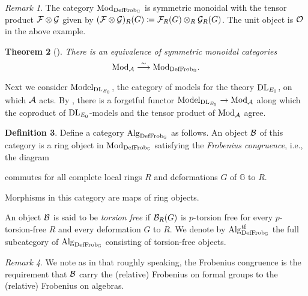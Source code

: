 \documentclass{gtpart}
\newtheorem{thm}{Theorem}
\theoremstyle{definition}
\newtheorem{defn}[thm]{Definition}
\theoremstyle{remark}
\newtheorem{rmk}[thm]{Remark}
\newcommand{\mb}[1]{\mathbb{#1}}
\newcommand{\CA}{{\cal A}}
\newcommand{\CB}{{\cal B}}
\newcommand{\CF}{{\cal F}}
\newcommand{\CG}{{\cal G}}
\newcommand{\CO}{{\cal O}}
\newcommand{\Mod}{{\rm Mod}}
\newcommand{\Alg}{{\rm Alg}}
\newcommand{\dl}{{\rm DL}}
\newcommand{\Frob}{{\rm Frob}}
\newcommand{\DF}{{{\rm DefFrob}_\BG}}
\newcommand{\Model}{{\rm Model}}
\newcommand{\BG}{{\mb G}}
\newcommand{\tf}{{\rm tf}}
\newcommand{\ce}{\coloneqq}
\numberwithin{equation}{section}
\numberwithin{thm}{section}
\begin{document}
\begin{rmk}
 The category $\Mod_\DF$ is symmetric monoidal with the tensor product 
 $\CF \otimes \CG$ given by 
 $(\CF \otimes \CG)_R(G) \ce \CF_R(G) \otimes_R \CG_R(G)$.  The unit 
 object is $\CO$ in the above example.  
\end{rmk}

\begin{thm}[{\cite[Pre-Theorem 16.4]{lpo}}]
 There is an equivalence of symmetric monoidal categories 
 \[
  \Mod_\CA \stackrel{\sim}{\longrightarrow} \Mod_\DF.  
 \]
\end{thm}

Next we consider $\Model_{\dl_{E_0}}$, the category of models for the 
theory $\dl_{E_0}$, on which $\CA$ acts.  By \cite[Proposition 7.6]{lpo}, 
there is a forgetful functor $\Model_{\dl_{E_0}} \to \Mod_\CA$ along 
which the coproduct of $\dl_{E_0}$-models and the tensor product of 
$\Mod_\CA$ agree.  

\begin{defn}
\label{def:alg}
 Define a category $\Alg_\DF$ as follows.  An object $\CB$ of this 
 category is a ring object in $\Mod_\DF$ satisfying the {\em Frobenius 
 congruence}, i.e., the diagram 
 \begin{center}
 \end{center}
 commutes for all complete local rings $R$ and deformations $G$ of $\BG$ 
 to $R$.  

 Morphisms in this category are maps of ring objects.  

 An object $\CB$ is said to be {\em torsion free} if $\CB_R(G)$ is 
 $p$-torsion free for every $p$-torsion-free $R$ and every deformation 
 $G$ to $R$.  We denote by $\Alg_\DF^\tf$ the full subcategory of 
 $\Alg_\DF$ consisting of torsion-free objects.  
\end{defn}

\begin{rmk}
 We note as in \cite[11.18]{cong} that roughly speaking, the Frobenius 
 congruence is the requirement that $\CB$ carry the (relative) Frobenius 
 on formal groups to the (relative) Frobenius on algebras.  
\end{rmk}
\end{document}
